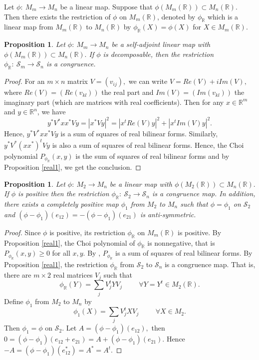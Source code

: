 \documentclass[12pt,a4paper]{amsart}
\theoremstyle{plain}
\newtheorem{proposition}[theorem]{Proposition}
\theoremstyle{remark}
\theoremstyle{definition}
\def \R {\mathbb{R}}
\def \cS {\mathcal{S}}
\begin{document}
Let $\phi:\ M_m \longrightarrow M_n$ be a linear map. Suppose that $\phi (M_m(\R)) \subset M_n(\R).$ Then there exists the restriction of $\phi$ on $M_m(\R)$, denoted by $\phi_{\R}$ which is a linear map from $M_m(\R)$ to $M_n(\R)$ by $\phi_{\R} (X) = \phi (X)$ for $X\in M_m(\R).$
\begin{proposition}\label{Decom_Cong}
Let $\phi:\ M_m \longrightarrow M_n$ be a self-adjoint linear map with $\phi (M_m(\R)) \subset M_n(\R).$  If $\phi$ is decomposable, then the restriction $\phi_{\R}:\ \cS_m \to \cS_n $ is a congruence.
\end{proposition}
\begin{proof}
For an $m\times n$ matrix $V=(v_{ij}),$ we can write $V = Re(V) + iIm(V),$ where $Re(V) = (Re(v_{kl}))$ the real part and $Im(V) = (Im(v_{kl}))$ the imaginary part (which are matrices with real coefficients). Then for any $x\in \R^m$ and $y\in \R^n$, we have
$$ 
y^*V^*xx^*Vy = |x^*Vy|^2 = |x^tRe(V)y|^2+ |x^t Im(V)y|^2 .
$$	
Hence, $y^*V^*xx^*Vy$ is a sum of squares of real bilinear forms. Similarly, $y^*V^*(xx^*)^tVy$ is also a sum of squares of real bilinear forms.
Hence, the Choi polynomial $P_{\phi_{\R}}(x,y)$ is the sum of squares of real bilinear forms and by Proposition \ref{real1}, we get the conclusion.
\end{proof}
\begin{proposition}
Let $\phi:\ M_2 \longrightarrow M_n$ be a linear map with $\phi (M_2(\R)) \subset M_n(\R).$ If $\phi$ is positive then the restriction $\phi_{\R}:\  \cS_2 \to \cS_n$ is a congruence map. In addition, there exists a completely positive map $\phi_1$ from $M_2$ to $M_n$ such that $\phi = \phi_1$ on $\cS_2$ and $(\phi-\phi_1)(e_{12}) =-(\phi-\phi_1)(e_{21})$ is anti-symmetric. 
\end{proposition}
\begin{proof}
Since $\phi$ is positive, its restriction $\phi_{\R}$ on $M_m(\R)$ is positive. By Proposition \ref{real1}, the Choi polynomial of $\phi_{\R}$ is nonnegative, that is $P_{\phi_{\R}}(x,y) \ge 0$ for all $x,y.$ By \cite[Theorem 1]{Calderon}, $P_{\phi_{\R}}$ is a sum of squares of real bilinear forms. By Proposition \ref{real1}, the restriction $\phi_{\R}$ from $\cS_2$ to $\cS_n$ is a congruence map. That is, there are $m\times 2$ real matrices $V_j$ such that
$$\phi_{\R} (Y) = \sum_{j} V_j^t Y V_j \hspace{1cm} \forall Y =Y^t \in M_2(\R).$$
Define $\phi_1$ from $M_2$ to $M_n$ by 
$$\phi_{1} (X) = \sum_{j} V_j^t X V_j \hspace{1cm} \forall X \in M_2.$$
Then $\phi_1 =\phi$ on $\cS_2.$ Let $ A= (\phi -\phi_1) (e_{12}), $ then 
$0=(\phi -\phi_{1}) (e_{12}+e_{21}) = A + (\phi -\phi_1) (e_{21}).$
Hence $-A = (\phi -\phi_1)(e_{12}^*) = A^* = A^t.$
\end{proof}
\end{document}
